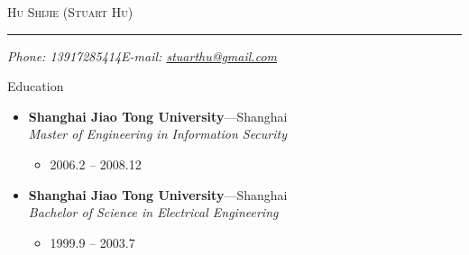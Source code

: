 \documentclass[11pt,oneside]{article}
\makeatletter
\newcommand{\name}{Hu Shijie (Stuart Hu)}
\newcommand{\phone}{Phone: 13917285414}
\newcommand{\email}{E-mail: \href{mailto:stuarthu@gmail.com}{stuarthu@gmail.com}}
\newcommand{\bigname}[1]{
	\begin{center}\selectfont\Huge\scshape#1\end{center}
}
\newenvironment{ressection}[1]{
	\vspace{4pt}
	{\selectfont\Large#1}
	\begin{itemize}
	\vspace{3pt}
}{
	\end{itemize}
}
\newcommand{\ressubitem}[1]{
	\vspace{-1pt}
	\item \begin{flushleft} #1 \end{flushleft}
}
\newcommand{\resbigitem}[3]{
	\vspace{-5pt}
	\item
	\textbf{#1}---#2 \\
	\textit{#3}
}
\newenvironment{ressubsec}[3]{
	\resbigitem{#1}{#2}{#3}
	\vspace{-2pt}
	\begin{itemize}
}{
    \end{itemize}
}
\makeatother
\begin{document}
\bigname{\name}

\vspace{-8pt} \rule{\textwidth}{1pt}

\vspace{-1pt} {\small\itshape \phone \hfill \email}

\vspace{8 pt}


\begin{ressection}{Education}

	\begin{ressubsec}{Shanghai Jiao Tong University}{Shanghai}{Master of Engineering in Information Security}
		\ressubitem{2006.2 -- 2008.12}
	\end{ressubsec}

	\begin{ressubsec}{Shanghai Jiao Tong University}{Shanghai}{Bachelor of Science in Electrical Engineering}
		\ressubitem{1999.9 -- 2003.7}
	\end{ressubsec}

\end{ressection}
\end{document}
